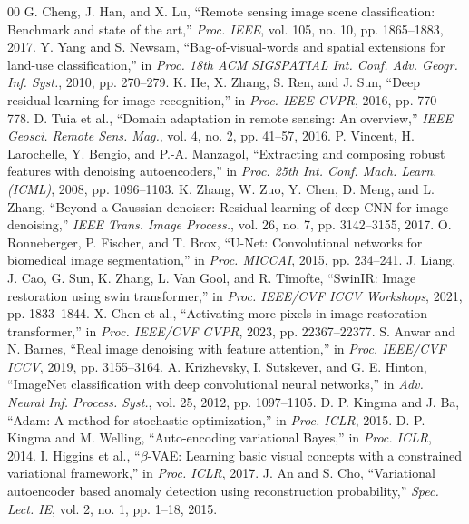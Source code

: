 \documentclass[journal]{IEEEtran}
\begin{document}
\begin{thebibliography}{00}
 G. Cheng, J. Han, and X. Lu, ``Remote sensing image scene classification: Benchmark and state of the art,'' \textit{Proc. IEEE}, vol. 105, no. 10, pp. 1865--1883, 2017.
 Y. Yang and S. Newsam, ``Bag-of-visual-words and spatial extensions for land-use classification,'' in \textit{Proc. 18th ACM SIGSPATIAL Int. Conf. Adv. Geogr. Inf. Syst.}, 2010, pp. 270--279.
 K. He, X. Zhang, S. Ren, and J. Sun, ``Deep residual learning for image recognition,'' in \textit{Proc. IEEE CVPR}, 2016, pp. 770--778.
 D. Tuia et al., ``Domain adaptation in remote sensing: An overview,'' \textit{IEEE Geosci. Remote Sens. Mag.}, vol. 4, no. 2, pp. 41--57, 2016.
 P. Vincent, H. Larochelle, Y. Bengio, and P.-A. Manzagol, ``Extracting and composing robust features with denoising autoencoders,'' in \textit{Proc. 25th Int. Conf. Mach. Learn. (ICML)}, 2008, pp. 1096--1103.
 K. Zhang, W. Zuo, Y. Chen, D. Meng, and L. Zhang, ``Beyond a Gaussian denoiser: Residual learning of deep CNN for image denoising,'' \textit{IEEE Trans. Image Process.}, vol. 26, no. 7, pp. 3142--3155, 2017.
 O. Ronneberger, P. Fischer, and T. Brox, ``U-Net: Convolutional networks for biomedical image segmentation,'' in \textit{Proc. MICCAI}, 2015, pp. 234--241.
 J. Liang, J. Cao, G. Sun, K. Zhang, L. Van Gool, and R. Timofte, ``SwinIR: Image restoration using swin transformer,'' in \textit{Proc. IEEE/CVF ICCV Workshops}, 2021, pp. 1833--1844.
 X. Chen et al., ``Activating more pixels in image restoration transformer,'' in \textit{Proc. IEEE/CVF CVPR}, 2023, pp. 22367--22377.
 S. Anwar and N. Barnes, ``Real image denoising with feature attention,'' in \textit{Proc. IEEE/CVF ICCV}, 2019, pp. 3155--3164.
 A. Krizhevsky, I. Sutskever, and G. E. Hinton, ``ImageNet classification with deep convolutional neural networks,'' in \textit{Adv. Neural Inf. Process. Syst.}, vol. 25, 2012, pp. 1097--1105.
 D. P. Kingma and J. Ba, ``Adam: A method for stochastic optimization,'' in \textit{Proc. ICLR}, 2015.
 D. P. Kingma and M. Welling, ``Auto-encoding variational Bayes,'' in \textit{Proc. ICLR}, 2014.
 I. Higgins et al., ``$\beta$-VAE: Learning basic visual concepts with a constrained variational framework,'' in \textit{Proc. ICLR}, 2017.
 J. An and S. Cho, ``Variational autoencoder based anomaly detection using reconstruction probability,'' \textit{Spec. Lect. IE}, vol. 2, no. 1, pp. 1--18, 2015.

\end{thebibliography}
\end{document}
